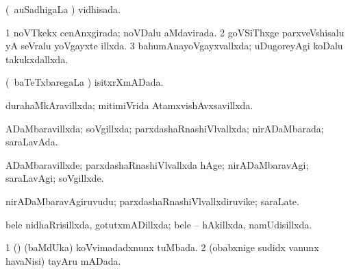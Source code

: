 {{\bentry
{} 
\gl{\gu}
\expl{}
\bmng
(\kanmu\ auSadhigaLa \vi) vidhisada. 
\emng
\eentry

\bentry
{} 
\gl{\gu}
\expl{}
\bmng
\bnum
\num{1} noVTkekx cenAnxgirada; noVDalu aMdavirada. 
\num{2} goVSiThxge parxveVshisalu yA seVralu yoVgayxte illxda. 
\num{3} bahumAnayoVgayxvallxda; uDugoreyAgi koDalu takukxdallxda. 
\enum
\emng
\eentry

\bentry
{} 
\gl{\gu}
\expl{}
\bmng
(\kanmu\ baTeTxbaregaLa \vi) isitxrXmADada. 
\emng
\eentry

\bentry
{} 
\gl{\gu}
\expl{}
\bmng
{} 
\emng
\eentry

\bentry
{} 
\gl{\gu}
\expl{}
\bmng
durahaMkAravillxda; mitimiVrida AtamxvishAvxsavillxda. 
\emng
\eentry

\bentry
{} 
\gl{\gu}
\expl{}
\bmng
ADaMbaravillxda; soVgillxda; parxdashaRnashiVlvallxda; nirADaMbarada; saraLavAda. 
\emng
\eentry

\bentry
{} 
\gl{\kirxvi}
\expl{}
\bmng
ADaMbaravillxde; parxdashaRnashiVlvallxda hAge; nirADaMbaravAgi; saraLavAgi; soVgillxde. 
\emng
\eentry

\bentry
{} 
\gl{\nA}
\expl{}
\bmng
nirADaMbaravAgiruvudu; parxdashaRnashiVlvallxdiruvike; saraLate. 
\emng
\eentry

\bentry
{} 
\gl{\gu}
\expl{}
\bmng
{} 
\emng
\eentry

\bentry
{} 
\gl{\kirxvi}
\expl{}
\bmng
{} 
\emng
\eentry

\bentry
{} 
\gl{\nA}
\expl{}
\bmng
{} 
\emng
\eentry

\bentry
{} 
\gl{\gu}
\expl{}
\bmng
bele nidhaRrisillxda, gotutxmADillxda; bele -- hAkillxda, namUdisillxda. 
\emng
\eentry

\bentry
{} 
\gl{\gu}
\expl{}
\bmng
\bnum
\num{1} (\ca) (baMdUka) koVvimadadxnunx tuMbada. 
\num{2} (obabxnige sudidx \mo vanunx havaNisi) tayAru mADada. 
\enum
\emng
\eentry

}}
